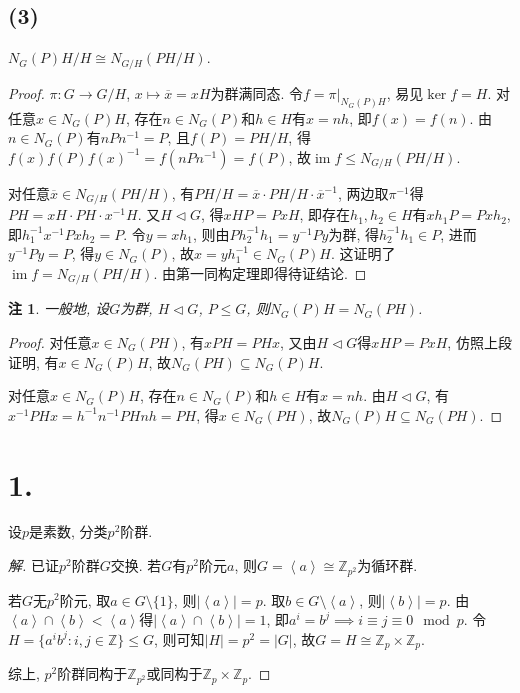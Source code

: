 \documentclass[12pt, a4paper, fontset=windows]{ctexart}
\newcommand{\Z}{\mathbb{Z}}
\newcommand{\abs}[1]{\left|{#1}\right|}
\newcommand{\cl}[1]{\overline{#1}} %
\newcommand{\gen}[1]{\left\langle{#1}\right\rangle}
\newcommand{\im}{\operatorname{im}}
\newcommand{\isom}{\cong} %
\newtheorem*{remark}{注}
\newenvironment{solution}{\begin{proof}[解]}{\end{proof}}
\begin{document}
\subsection*{(3)}

$N_G(P)H/H\isom N_{G/H}(PH/H)$. 


\begin{proof}
$\pi:G\to G/H$, $x\mapsto\cl{x}=xH$为群满同态. 
令$f=\pi|_{N_G(P)H}$, 易见$\ker f=H$. 
对任意$x\in N_G(P)H$, 存在$n\in N_G(P)$和$h\in H$有$x=nh$, 即$f(x)=f(n)$. 
由$n\in N_G(P)$有$nPn^{-1}=P$, 且$f(P)=PH/H$, 得$f(x)f(P)f(x)^{-1}=f(nPn^{-1})=f(P)$, 
故$\im f\le N_{G/H}(PH/H)$. 

对任意$\cl{x}\in N_{G/H}(PH/H)$, 有$PH/H=\cl{x}\cdot PH/H\cdot\cl{x}^{-1}$, 
两边取$\pi^{-1}$得$PH=xH\cdot PH\cdot x^{-1}H$. 又$H\lhd G$, 得$xHP=PxH$, 
即存在$h_1,h_2\in H$有$xh_1P=Pxh_2$, 即$h_1^{-1}x^{-1}Pxh_2=P$. 
令$y=xh_1$, 则由$Ph_2^{-1}h_1=y^{-1}Py$为群, 得$h_2^{-1}h_1\in P$, 
进而$y^{-1}Py=P$, 得$y\in N_G(P)$, 故$x=yh_1^{-1}\in N_G(P)H$. 
这证明了$\im f=N_{G/H}(PH/H)$. 由第一同构定理即得待证结论. 
\end{proof}

\begin{remark}
一般地, 设$G$为群, $H\lhd G$, $P\le G$, 则$N_G(P)H=N_G(PH)$. 
\end{remark}

\begin{proof}
对任意$x\in N_G(PH)$, 有$xPH=PHx$, 又由$H\lhd G$得$xHP=PxH$, 
仿照上段证明, 有$x\in N_G(P)H$, 故$N_G(PH)\subseteq N_G(P)H$. 

对任意$x\in N_G(P)H$, 存在$n\in N_G(P)$和$h\in H$有$x=nh$. 
由$H\lhd G$, 有$x^{-1}PHx=h^{-1}n^{-1}PHnh=PH$, 得$x\in N_G(PH)$, 
故$N_G(P)H\subseteq N_G(PH)$. 
\end{proof}

\section*{1.}

设$p$是素数, 分类$p^2$阶群. 

\begin{solution}
已证$p^2$阶群$G$交换. 若$G$有$p^2$阶元$a$, 则$G=\gen{a}\isom\Z_{p^2}$为循环群. 

若$G$无$p^2$阶元, 取$a\in G\setminus\{1\}$, 则$\abs{\gen{a}}=p$. 
取$b\in G\setminus\gen{a}$, 则$\abs{\gen{b}}=p$. 由
$\gen{a}\cap\gen{b}<\gen{a}$得$\abs{\gen{a}\cap\gen{b}}=1$, 
即$a^i=b^j\implies i\equiv j\equiv 0\mod{p}$. 
令$H=\{a^ib^j:i,j\in\Z\}\le G$, 则可知$\abs{H}=p^2=\abs{G}$, 
故$G=H\isom\Z_p\times\Z_p$. 

综上, $p^2$阶群同构于$\Z_{p^2}$或同构于$\Z_p\times\Z_p$. 
\end{solution}
\end{document}
